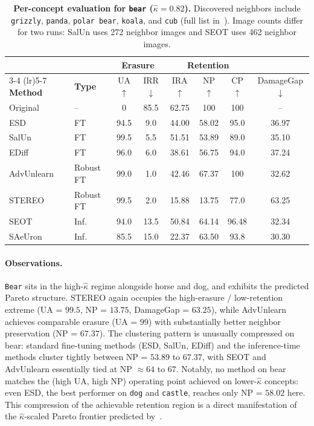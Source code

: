 \begin{table}[ht]
\centering
\small
\setlength{\tabcolsep}{5pt}
\begin{tabular}{llcccccc}
\toprule
& & \multicolumn{2}{c}{\textbf{Erasure}} & \multicolumn{3}{c}{\textbf{Retention}} & \\
\cmidrule(lr){3-4} \cmidrule(lr){5-7}
\textbf{Method} & \textbf{Type} & UA$\uparrow$ & IRR$\downarrow$ & IRA$\uparrow$ & NP$\uparrow$ & CP$\uparrow$ & DamageGap$\downarrow$ \\
\midrule
Original    & --          & 0     & 85.5  & 62.75 & 100   & 100   & --    \\
\midrule
ESD         & FT          & 94.5  & 9.0   & 44.00 & 58.02 & 95.0  & 36.97 \\
SalUn       & FT          & 99.5  & 5.5   & 51.51 & 53.89 & 89.0  & 35.10 \\
EDiff       & FT          & 96.0  & 6.0   & 38.61 & 56.75 & 94.0  & 37.24 \\
\midrule
AdvUnlearn  & Robust FT   & 99.0  & 1.0   & 42.46 & 67.37 & 100   & 32.62 \\
STEREO      & Robust FT   & 99.5  & 2.0   & 15.88 & 13.75 & 77.0  & 63.25 \\
\midrule
SEOT        & Inf.        & 94.0  & 13.5  & 50.84 & 64.14 & 96.48 & 32.34 \\
SAeUron     & Inf.        & 85.5  & 15.0  & 22.37 & 63.50 & 93.8  & 30.30 \\
\bottomrule
\end{tabular}
\caption{\textbf{Per-concept evaluation for \texttt{bear} ($\hat\kappa = 0.82$).} Discovered neighbors include \texttt{grizzly}, \texttt{panda}, \texttt{polar bear}, \texttt{koala}, and \texttt{cub} (full list in~). Image counts differ for two runs: SalUn uses 272 neighbor images and SEOT uses 462 neighbor images.}
\label{tab:per_concept_bear}
\end{table}

\paragraph{Observations.}
\texttt{Bear} sits in the high-$\hat\kappa$ regime alongside horse and dog, and exhibits the predicted Pareto structure. STEREO again occupies the high-erasure / low-retention extreme (UA = $99.5$, NP = $13.75$, DamageGap = $63.25$), while AdvUnlearn achieves comparable erasure (UA = $99$) with substantially better neighbor preservation (NP = $67.37$). The clustering pattern is unusually compressed on bear: standard fine-tuning methods (ESD, SalUn, EDiff) and the inference-time methods cluster tightly between NP = $53.89$ to $67.37$, with SEOT and AdvUnlearn essentially tied at NP $\approx 64$ to $67$. Notably, no method on bear matches the (high UA, high NP) operating point achieved on lower-$\hat\kappa$ concepts: even ESD, the best performer on \texttt{dog} and \texttt{castle}, reaches only NP = $58.02$ here. This compression of the achievable retention region is a direct manifestation of the $\hat\kappa$-scaled Pareto frontier predicted by~.
